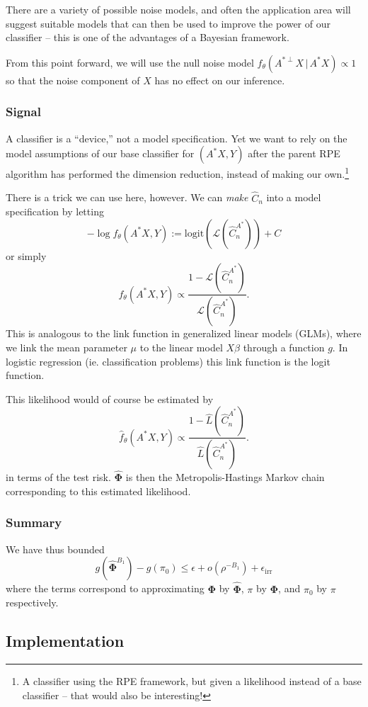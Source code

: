 \documentclass[ejs,preprint]{imsart}
\newcommand\risk{\mathcal{L}}
\begin{document}
There are a variety of possible noise models, and often the application area will suggest suitable models that can then be used to improve the power of our classifier -- this is one of the advantages of a Bayesian framework.

From this point forward, we will use the null noise model $f_\theta(A^{*\perp} X \,|\,A^* X) \propto 1$ so that the noise component of $X$ has no effect on our inference.

\subsubsection{Signal}

A classifier is a ``device,'' not a model specification. Yet we want to rely on the model assumptions of our base classifier for $(A^*X,Y)$ after the parent RPE algorithm has performed the dimension reduction, instead of making our own.\footnote{A classifier using the RPE framework, but given a likelihood instead of a base classifier -- that would also be interesting!}

There is a trick we can use here, however. We can \emph{make} $\hat C_n$ into a model specification by letting
\[
-\log f_\theta(A^*X,Y) := \mathrm{logit}\left( \risk(\hat C_n^{A^*}) \right)+C
\]
or simply
\[
f_\theta(A^*X,Y) \propto \frac{1-\risk(\hat C_n^{A^*})}{\risk(\hat C_n^{A^*})}.
\]
This is analogous to the link function in generalized linear models (GLMs), where we link the mean parameter $\mu$ to the linear model $X\beta$ through a function $g$. In logistic regression (ie. classification problems) this link function is the logit function.

This likelihood would of course be estimated by
\[
\hat f_\theta(A^*X,Y) \propto \frac{1-\hat L(\hat C_n^{A^*})}{\hat L(\hat C_n^{A^*})}.
\]
in terms of the test risk. $\hat{\bm{\Phi}}$ is then the Metropolis-Hastings Markov chain corresponding to this estimated likelihood.

\subsubsection{Summary}

We have thus bounded 
\[
g(\hat{\bm{\Phi}}^{B_1})-g(\pi_0) \leq \epsilon + o(\rho^{-B_1}) + \epsilon_\mathrm{irr}
\]
where the terms correspond to approximating $\bm{\Phi}$ by $\hat{\bm{\Phi}}$, $\pi$ by $\bm{\Phi}$, and $\pi_0$ by $\pi$ respectively.

\subsection{Implementation}
\end{document}

